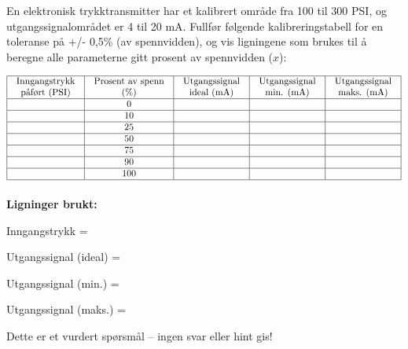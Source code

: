 

En elektronisk trykktransmitter har et kalibrert område fra 100 til 300 PSI, og utgangssignalområdet er 4 til 20 mA.  Fullfør følgende kalibreringstabell for en toleranse på +/- 0,5\% (av spennvidden), og vis ligningene som brukes til å beregne alle parameterne gitt prosent av spennvidden ($x$):


$$\vbox{\offinterlineskip
\halign{\strut
\vrule \quad\hfil # \ \hfil & 
\vrule \quad\hfil # \ \hfil & 
\vrule \quad\hfil # \ \hfil & 
\vrule \quad\hfil # \ \hfil & 
\vrule \quad\hfil # \ \hfil \vrule \cr
\noalign{\hrule}
%
Inngangstrykk & Prosent av spenn & Utgangssignal & Utgangssignal & Utgangssignal \cr
%
påført (PSI) & (\%) & ideal (mA) & min. (mA) & maks. (mA) \cr
%
\noalign{\hrule}
%
 & 0 &  &  &  \cr
%
\noalign{\hrule}
%
 & 10 &  &  &  \cr
%
\noalign{\hrule}
%
 & 25 &  &  &  \cr
%
\noalign{\hrule}
%
 & 50 &  &  &  \cr
%
\noalign{\hrule}
%
 & 75 &  &  &  \cr
%
\noalign{\hrule}
%
 & 90 &  &  &  \cr
%
\noalign{\hrule}
%
 & 100 &  &  &  \cr
%
\noalign{\hrule}
} %
}$$ %

\vskip 10pt

\noindent
{\bf Ligninger brukt:}

\vskip 20pt

Inngangstrykk =

\vskip 20pt

Utgangssignal (ideal) =

\vskip 20pt

Utgangssignal (min.) =

\vskip 20pt

Utgangssignal (maks.) =

\vfil 

\eject






Dette er et vurdert spørsmål -- ingen svar eller hint gis!

